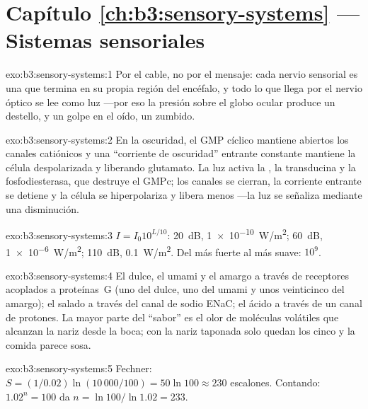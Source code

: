 \section*{Capítulo \ref{ch:b3:sensory-systems} --- Sistemas sensoriales}

\begin{solution}{exo:b3:sensory-systems:1}
Por el cable, no por el mensaje: cada nervio sensorial es una  que termina en su propia región del encéfalo, y todo lo que
llega por el nervio óptico se lee como luz ---por eso la presión sobre
el globo ocular produce un destello, y un golpe en el oído, un zumbido.
\end{solution}

\begin{solution}{exo:b3:sensory-systems:2}
En la oscuridad, el GMP cíclico mantiene abiertos los canales
catiónicos y una ``corriente de oscuridad'' entrante constante mantiene
la célula despolarizada y liberando glutamato. La luz activa la
, la transducina y la fosfodiesterasa, que destruye el GMPc;
los canales se cierran, la corriente entrante se detiene y la célula se
hiperpolariza y libera menos ---la luz se señaliza mediante una
disminución.
\end{solution}

\begin{solution}{exo:b3:sensory-systems:3}
$I = I_{0}10^{L/10}$: \qty{20}{dB}, \qty{1e-10}{W/m^2}; \qty{60}{dB},
\qty{1e-6}{W/m^2}; \qty{110}{dB}, \qty{0.1}{W/m^2}. Del más fuerte al
más suave: $10^{9}$.
\end{solution}

\begin{solution}{exo:b3:sensory-systems:4}
El dulce, el umami y el amargo a través de receptores acoplados a
proteínas~G (uno del dulce, uno del umami y unos veinticinco del
amargo); el salado a través del canal de sodio ENaC; el ácido a través
de un canal de protones. La mayor parte del ``sabor'' es el olor de
moléculas volátiles que alcanzan la nariz desde la boca; con la nariz
taponada solo quedan los cinco  y la comida parece sosa.
\end{solution}

\begin{solution}{exo:b3:sensory-systems:5}
Fechner: $S = (1/0.02)\ln(10\,000/100) = 50\ln 100 \approx 230$
escalones. Contando: $1.02^{n} = 100$ da $n = \ln 100/\ln 1.02 = 233$.
\end{solution}


